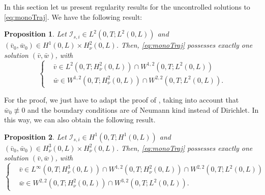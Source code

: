 \documentclass[10pt]{article}
\newtheorem{propo}{Proposition}
\def\\Phivec{\mathbf{\Phi}}
\begin{document}
    In this section let us present regularity results for the uncontrolled solutions to \eqref{eq:monoTraj}.
    We have the following result:
\begin{propo}\label{propo:regular_trajec}
    Let $\mathcal{I}_{s,i}\in L^2(0,T;L^2(0,L))$ and $(\bar v_0,\bar w_0)\in H^1(0,L)\times H^2_\nu(0,L)$. Then, \eqref{eq:monoTraj}
    possesses exactly one solution $(\bar v,\bar w)$, with
\begin{equation}\label{reg_traj}
\left\{
    \begin{alignedat}{2}
        &\bar v\in L^2(0,T;H^2_\nu(0,L))\cap W^{1,2}(0,T;L^2(0,L))\\
        &\bar w\in  W^{1,2}(0,T;H^2_\nu(0,L))\cap W^{2,2}(0,T;L^2(0,L)).
    \end{alignedat}
    \right.
\end{equation}
\end{propo}
    For the proof, we just have to adapt the proof of \cite[Theorem $1.1$]{brandao}, taking into account that
    $\bar w_0\not\equiv0$ and the boundary conditions are of Neumann kind instead of Dirichlet. In this way, we can also obtain the following result.
\begin{propo}\label{propo:regular_trajec2}
    Let $\mathcal{I}_{s,i}\in H^1(0,T;H^1(0,L))$ and $(\bar v_0,\bar w_0)\in H^3_\nu(0,L)\times H^2_\nu(0,L)$. Then, \eqref{eq:monoTraj}
    possesses exactly one solution $(\bar v,\bar w)$, with
    \[
\left\{
    \begin{alignedat}{2}
         &\bar v\in L^\infty(0,T; H^3_\nu(0,L))\cap W^{1,2}(0,T;H^2_\nu(0,L))\cap W^{2,2}(0,T;L^2(0,L))\\
        &\bar w\in  W^{2,2}(0,T;H^2_\nu(0,L))\cap W^{3,2}(0,T;L^2(0,L)).
    \end{alignedat}
    \right.
\]
  \end{propo}
\end{document}
